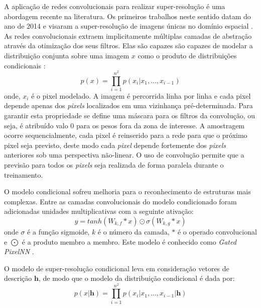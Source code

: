 {A aplicação de redes convolucionais para realizar super-resolução é uma abordagem
recente na literatura. Os primeiros trabalhos neste sentido datam
do ano de 2014 e visaram a super-resolução de imagens únicas no
domínio espacial \cite{dong16}. As redes convolucionais extraem implicitamente
múltiplas camadas de abstração através da otimização dos seus filtros.
Elas são capazes são capazes de modelar a distribuição conjunta sobre
uma imagem $x$ como o produto de distribuições condicionais \citep{Oord16}:
\begin{equation}
\label{eqn:prodcnn}
p(x) = \prod_{i=1}^{n^2}p(x_i|x_1,...,x_{i-1})
\end{equation}
onde, $x_i$ é o pixel modelado. A imagem é percorrida linha por linha e cada
pixel depende apenas dos \textit{pixels} localizados em uma vizinhança pré-determinada.
Para garantir esta propriedade se define uma máscara para os filtros da convolução,
ou seja, é atribuído valo 0 para os pesos fora da zona de interesse.
A amostragem ocorre sequencialmente, cada pixel é reinserido para a rede para que o próximo pixel seja previsto,
deste modo cada \textit{pixel} depende fortemente dos \textit{pixels} anteriores
sob uma perspectiva não-linear. O uso de convolução permite que a previsão para todos os \textit{pixels} seja realizada de
forma paralela durante o treinamento.

O modelo condicional sofreu melhoria para o reconhecimento de estruturas mais complexas.
Entre as camadas convolucionais do modelo condicionado foram adicionadas unidades
multiplicativas com a seguinte ativação:
\begin{equation}
\label{eqn:actvcnn}
y = tanh(W_{k,f} * x)\odot \sigma(W_{k,g}*x)
\end{equation}
onde $\sigma$ é a função sigmoide, $k$ é o número da camada, $*$ é o operado
convolucional e $\bigodot$ é a produto membro a membro. Este modelo é
conhecido como \textit{Gated PixelNN} \citep{Oord16}.

O modelo de super-resolução condicional leva em consideração vetores de
descrição $\boldsymbol{h}$, de modo que o modelo da distribuição condicional é dada
por:
\begin{equation}
\label{eqn:prodcnncond}
p(x|\boldsymbol{h}) = \prod_{i=1}^{n^2}p(x_i|x_1,...,x_{i-1}|\boldsymbol{h})
\end{equation}

}
